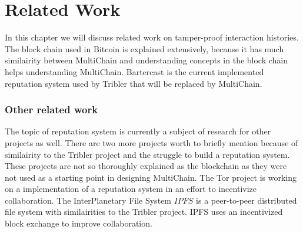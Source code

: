 \chapter{Related Work}
In this chapter we will discuss related work on tamper-proof interaction histories.
The block chain used in Bitcoin is explained extensively,
because it has much similairity between MultiChain and understanding concepts in the block chain helps understanding MultiChain.
Bartercast is the current implemented reputation system used by Tribler that will be replaced by MultiChain.





\subsection{Other related work}
The topic of reputation system is currently a subject of research for other projects as well.
There are two more projects worth to briefly mention because of similairity to the Tribler project
and the struggle to build a reputation system.
These projects are not so thoroughly explained as the blockchain
as they were not used as a starting point in designing MultiChain.
The Tor project is working on a implementation of a reputation system
in an effort to incentivize collaboration\cite{androulaki-torincentive}\cite{chen-torincentive}\cite{dingledine-torincentive}\cite{ghosh-torincentive}\cite{jansen-torincentive}.
The InterPlanetary File System \(IPFS\) is a peer-to-peer distributed file system with similairities to the Tribler project.
IPFS uses an incentivized block exchange to improve collaboration\cite{benet-ipfs}.